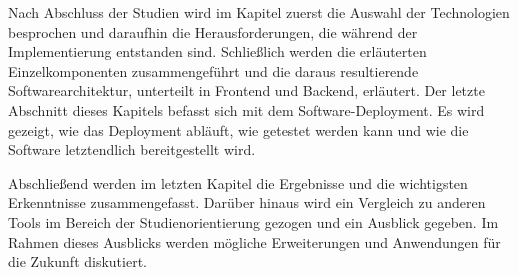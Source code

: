 Nach Abschluss der Studien wird im Kapitel  zuerst die Auswahl der Technologien besprochen und daraufhin die Herausforderungen, die während der Implementierung entstanden sind. Schließlich werden die erläuterten Einzelkomponenten zusammengeführt und die daraus resultierende Softwarearchitektur, unterteilt in Frontend und Backend, erläutert. Der letzte Abschnitt dieses Kapitels befasst sich mit dem Software-Deployment. Es wird gezeigt, wie das Deployment abläuft, wie getestet werden kann und wie die Software letztendlich bereitgestellt wird.

Abschließend werden im letzten Kapitel die Ergebnisse und die wichtigsten Erkenntnisse zusammengefasst. Darüber hinaus wird ein Vergleich zu anderen Tools im Bereich der Studienorientierung gezogen und ein Ausblick gegeben. Im Rahmen dieses Ausblicks werden mögliche Erweiterungen und Anwendungen für die Zukunft diskutiert.